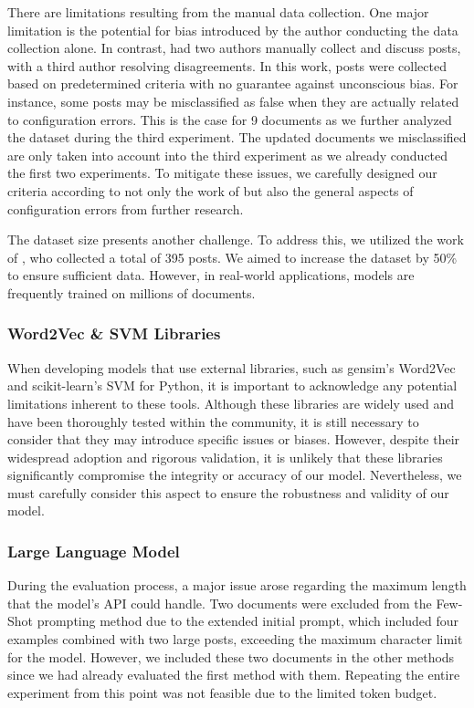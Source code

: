 \documentclass[english,bachelor]{swsLeipzig}
\begin{document}
There are limitations resulting from the manual data collection. One major limitation is the potential for bias introduced by the author conducting the data collection alone. In contrast, \citet{tian:2020} had two authors manually collect and discuss posts, with a third author resolving disagreements. In this work, posts were collected based on predetermined criteria with no guarantee against unconscious bias. For instance, some posts may be misclassified as false when they are actually related to configuration errors. This is the case for 9 documents as we further analyzed the dataset during the third experiment. The updated documents we misclassified are only taken into account into the third experiment as we already conducted the first two experiments. To mitigate these issues, we carefully designed our criteria according to not only the work of \citet{tian:2020} but also the general aspects of configuration errors from further research.

The dataset size presents another challenge. To address this, we utilized the work of \citet{tian:2020}, who collected a total of 395 posts. We aimed to increase the dataset by 50\% to ensure sufficient data. However, in real-world applications, models are frequently trained on millions of documents. 

\subsubsection{Word2Vec \& SVM Libraries}

When developing models that use external libraries, such as gensim's Word2Vec and scikit-learn's SVM for Python, it is important to acknowledge any potential limitations inherent to these tools. Although these libraries are widely used and have been thoroughly tested within the community, it is still necessary to consider that they may introduce specific issues or biases. However, despite their widespread adoption and rigorous validation, it is unlikely that these libraries significantly compromise the integrity or accuracy of our model. Nevertheless, we must carefully consider this aspect to ensure the robustness and validity of our model.

\subsubsection{Large Language Model}

During the evaluation process, a major issue arose regarding the maximum length that the model's API 
could handle. Two documents were excluded from the Few-Shot prompting method due to the extended initial prompt, which included four examples combined with two large posts, exceeding the maximum character limit for the model. However, we included these two documents in the other methods since we had already evaluated the first method with them. Repeating the entire experiment from this point was not feasible due to the limited token budget.
\end{document}
